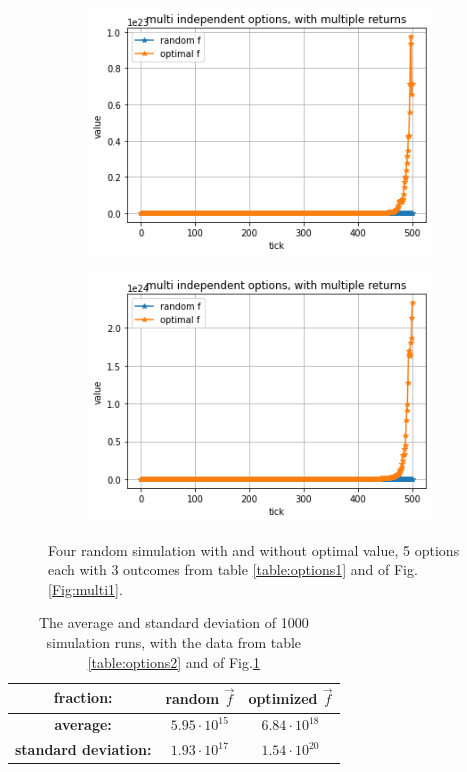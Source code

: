 \documentclass{article}
\begin{document}
\begin{figure}[!h]
\begin{subfigure}{0.525\textwidth}
		\end{subfigure}
		\begin{subfigure}{0.525\textwidth}
			\includegraphics[width=0.9\linewidth]{multi2-3}
		\end{subfigure}
		\begin{subfigure}{0.525\textwidth}
			\includegraphics[width=0.9\linewidth]{multi2-4}
		\end{subfigure}
		\caption{Four random simulation with and without optimal value, 5 options each with 3 outcomes from table \ref{table:options1} and of Fig.\ref{Fig:multi1}.}
		\label{Fig:multi2}
	\end{figure}
	

	\begin{table}[!h]
		\centering\begin{tabular}{|c||c|c|}
			\hline
			\textbf{fraction:} &random $\overrightarrow{f}$ &optimized $\overrightarrow{f}$ \\
			\hline\hline
			\textbf{average:}  & $5.95\cdot 10^{15}$ & $6.84\cdot 10^{18}$ \\
			\hline
			\textbf{standard deviation:}  & $1.93\cdot 10^{17}$ & $1.54\cdot 10^{20}$ \\
			\hline
		\end{tabular}
		\caption{The average and standard deviation of 1000 simulation runs, with the data from table \ref{table:options2} and of Fig.\ref{Fig:multi2}}
		\label{multi:results2}
	\end{table}
	
\end{document}
